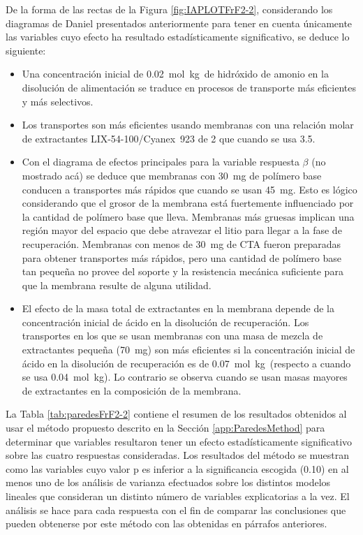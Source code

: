 De la forma de las rectas de la Figura \ref{fig:IAPLOTFrF2-2}, considerando los diagramas de Daniel presentados anteriormente para tener en cuenta únicamente las variables cuyo efecto ha resultado estadísticamente significativo, se deduce lo siguiente:
\begin{itemize}
    \item Una concentración inicial de 0.02~mol~kg\mnn\ de hidróxido de amonio en la disolución de alimentación se traduce en procesos de transporte más eficientes y más selectivos.
    \item Los transportes son más eficientes usando membranas con una relación molar de extractantes LIX-54-100/Cyanex~923 de 2 que cuando se usa 3.5.
    \item Con el diagrama de efectos principales para la variable respuesta $\beta$ (no mostrado acá) se deduce que membranas con 30~mg de polímero base conducen a transportes más rápidos que cuando se usan 45~mg. Esto es lógico considerando que el grosor de la membrana está fuertemente influenciado por la cantidad de polímero base que lleva. Membranas más gruesas implican una región mayor del espacio que debe atravezar el litio para llegar a la fase de recuperación. Membranas con menos de 30~mg de CTA fueron preparadas para obtener transportes más rápidos, pero una cantidad de polímero base tan pequeña no provee del soporte y la resistencia mecánica suficiente para que la membrana resulte de alguna utilidad.
    \item El efecto de la masa total de extractantes en la membrana depende de la concentración inicial de ácido en la disolución de recuperación. Los transportes en los que se usan membranas con una masa de mezcla de extractantes pequeña (70~mg) son más eficientes si la concentración inicial de ácido en la disolución de recuperación es de 0.07~mol~kg\mnn\ (respecto a cuando se usa 0.04~mol~kg\mnn). Lo contrario se observa cuando se usan masas mayores de extractantes en la composición de la membrana.
\end{itemize}

La Tabla \ref{tab:paredesFrF2-2} contiene el resumen de los resultados obtenidos al usar el método propuesto descrito en la Sección \ref{app:ParedesMethod} para determinar que variables resultaron tener un efecto estadísticamente significativo sobre las cuatro respuestas consideradas. Los resultados del método se muestran como las variables cuyo valor p es inferior a la significancia escogida (0.10) en al menos uno de los análisis de varianza efectuados sobre los distintos modelos lineales que consideran un distinto número de variables explicatorias a la vez. El análisis se hace para cada respuesta con el fin de comparar las conclusiones que pueden obtenerse por este método con las obtenidas en párrafos anteriores.

